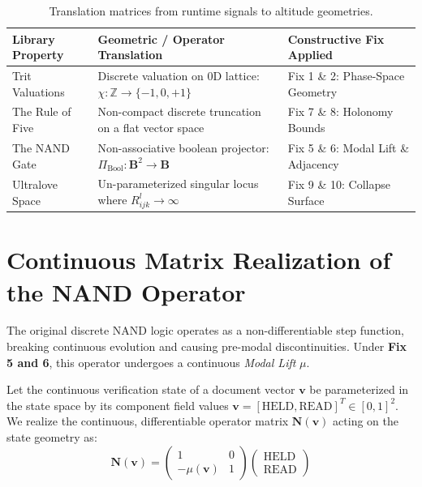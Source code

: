 \documentclass[11pt]{article}
\begin{document}
\begin{table}[h!]
\centering
\small
\begin{tabular}{lll}
\toprule
\textbf{Library Property} & \textbf{Geometric / Operator Translation} & \textbf{Constructive Fix Applied} \\
\midrule
Trit Valuations & Discrete valuation on 0D lattice: $\chi: \mathbb{Z} \to \{-1,0,+1\}$ & Fix 1 \& 2: Phase-Space Geometry \\
The Rule of Five & Non-compact discrete truncation on a flat vector space & Fix 7 \& 8: Holonomy Bounds \\
The NAND Gate & Non-associative boolean projector: $\Pi_{\text{Bool}}: \mathbf{B}^2 \to \mathbf{B}$ & Fix 5 \& 6: Modal Lift \& Adjacency \\
Ultralove Space & Un-parameterized singular locus where $R_{ijk}^l \to \infty$ & Fix 9 \& 10: Collapse Surface \\
\bottomrule
\end{tabular}
\caption{Translation matrices from runtime signals to altitude geometries.}
\end{table}

\section{Continuous Matrix Realization of the NAND Operator}
The original discrete NAND logic operates as a non-differentiable step function, breaking continuous evolution and causing pre-modal discontinuities. Under \textbf{Fix 5 and 6}, this operator undergoes a continuous \textit{Modal Lift} $\mu$. 

Let the continuous verification state of a document vector $\mathbf{v}$ be parameterized in the state space by its component field values $\mathbf{v} = [\text{HELD}, \text{READ}]^T \in [0, 1]^2$. We realize the continuous, differentiable operator matrix $\mathbf{N}(\mathbf{v})$ acting on the state geometry as:
\begin{equation}
\mathbf{N}(\mathbf{v}) = \begin{pmatrix} 1 & 0 \\ -\mu(\mathbf{v}) & 1 \end{pmatrix} 
\begin{pmatrix} \text{HELD} \\ \text{READ} \end{pmatrix}
\end{equation}
\end{document}
